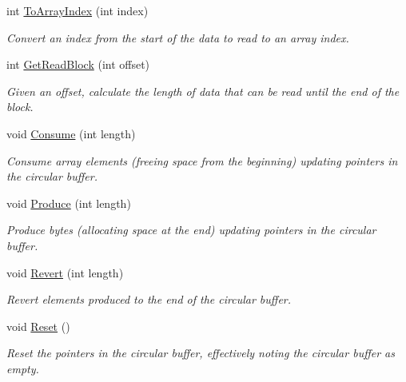 \begin{DoxyCompactItemize}
int \mbox{\hyperlink{class_r_j_c_p_1_1_datastructures_1_1_circular_buffer_aadfb2057db122636b7721fb9262b5bf9}{To\+Array\+Index}} (int index)
\begin{DoxyCompactList}\small\item\em Convert an index from the start of the data to read to an array index. \end{DoxyCompactList}\item 
int \mbox{\hyperlink{class_r_j_c_p_1_1_datastructures_1_1_circular_buffer_a50e241cdf81c4fb42ac5ff40c9288244}{Get\+Read\+Block}} (int offset)
\begin{DoxyCompactList}\small\item\em Given an offset, calculate the length of data that can be read until the end of the block. \end{DoxyCompactList}\item 
void \mbox{\hyperlink{class_r_j_c_p_1_1_datastructures_1_1_circular_buffer_a80abec3dc79318bb096fd14529cbbb2a}{Consume}} (int length)
\begin{DoxyCompactList}\small\item\em Consume array elements (freeing space from the beginning) updating pointers in the circular buffer. \end{DoxyCompactList}\item 
void \mbox{\hyperlink{class_r_j_c_p_1_1_datastructures_1_1_circular_buffer_aaca74dd28d174ddb86e0b8548a676889}{Produce}} (int length)
\begin{DoxyCompactList}\small\item\em Produce bytes (allocating space at the end) updating pointers in the circular buffer. \end{DoxyCompactList}\item 
void \mbox{\hyperlink{class_r_j_c_p_1_1_datastructures_1_1_circular_buffer_a4306bff98e415bb3238bcd180618a680}{Revert}} (int length)
\begin{DoxyCompactList}\small\item\em Revert elements produced to the end of the circular buffer. \end{DoxyCompactList}\item 
void \mbox{\hyperlink{class_r_j_c_p_1_1_datastructures_1_1_circular_buffer_af41b02f6c8de83e723a7116525c7c182}{Reset}} ()
\begin{DoxyCompactList}\small\item\em Reset the pointers in the circular buffer, effectively noting the circular buffer as empty. \end{DoxyCompactList}\item 

\end{DoxyCompactItemize}
